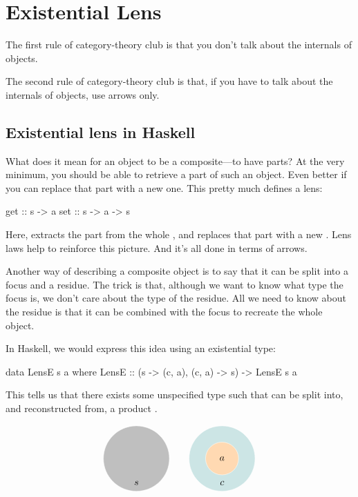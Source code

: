 \documentclass[DaoFP]{subfiles}
\begin{document}
\section{Existential Lens}

The first rule of category-theory club is that you don't talk about the internals of objects.

The second rule of category-theory club is that, if you have to talk about the internals of objects, use arrows only.

\subsection{Existential lens in Haskell}

What does it mean for an object to be a composite---to have parts? At the very minimum, you should be able to retrieve a part of such an object. Even better if you can replace that part with a new one. This pretty much defines a lens:
\begin{haskell}
get :: s -> a
set :: s -> a -> s
\end{haskell}
Here,  extracts the part  from the whole , and  replaces that part with a new . Lens laws help to reinforce this picture. And it's all done in terms of arrows. 

Another way of describing a composite object is to say that it can be split into a focus and a residue. The trick is that, although we want to know what type the focus is, we don't care about the type of the residue. All we need to know about the residue is that it can be combined with the focus to recreate the whole object. 

In Haskell, we would express this idea using an existential type:
\begin{haskell}
data LensE s a where
    LensE :: (s -> (c, a), (c, a) -> s) -> LensE s a
\end{haskell}
This tells us that there exists some unspecified type  such that  can be split into, and reconstructed from, a product . 

\[
\begin{tikzpicture}
\filldraw[fill=gray!50, draw=white] (0, 0) circle (1.2);
\node at (0, -0.9) {$s$};
\end{tikzpicture}
\hspace{20pt}
\begin{tikzpicture}
\filldraw[fill=blue!50!green!20, draw=white] (0, 0) circle (1.2);
\filldraw[fill=orange!30, draw=white] (0, 0) circle (0.6);
\node at (0, 0) {$a$};
\node at (0, -0.9) {$c$};
\end{tikzpicture}
\]
\end{document}
